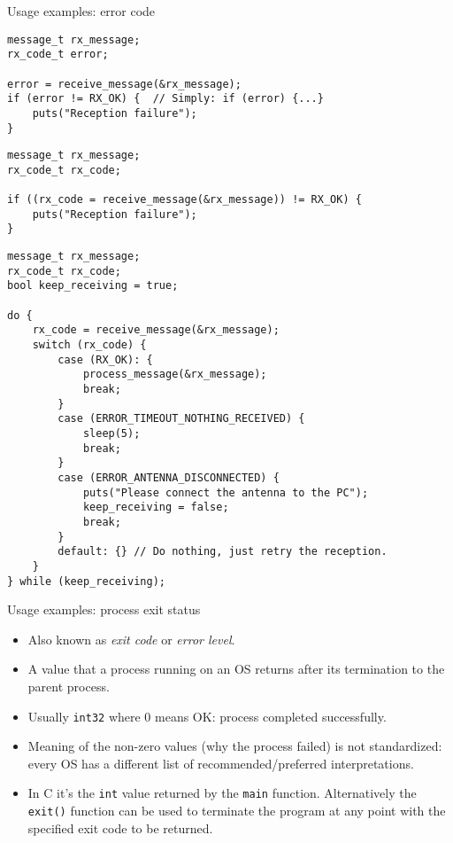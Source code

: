 \documentclass[aspectratio=169,14pt]{beamer}
\begin{document}
\begin{frame}[fragile]{Usage examples: error code}
\begin{lstlisting}[style=cstyle]
message_t rx_message;
rx_code_t error;

error = receive_message(&rx_message);
if (error != RX_OK) {  // Simply: if (error) {...}
    puts("Reception failure");
}
\end{lstlisting}

\begin{lstlisting}[style=cstyle]
message_t rx_message;
rx_code_t rx_code;

if ((rx_code = receive_message(&rx_message)) != RX_OK) {
    puts("Reception failure");
}
\end{lstlisting}
\end{frame}



\begin{frame}[fragile]{}
\begin{lstlisting}[style=cstyle,basicstyle=\scriptsize\ttfamily]
message_t rx_message;
rx_code_t rx_code;
bool keep_receiving = true;

do {
    rx_code = receive_message(&rx_message);
    switch (rx_code) {
        case (RX_OK): {
            process_message(&rx_message);
            break;
        }
        case (ERROR_TIMEOUT_NOTHING_RECEIVED) {
            sleep(5);
            break;
        }
        case (ERROR_ANTENNA_DISCONNECTED) {
            puts("Please connect the antenna to the PC");
            keep_receiving = false;
            break;
        }
        default: {} // Do nothing, just retry the reception.
    }
} while (keep_receiving);
\end{lstlisting}
\end{frame}



\begin{frame}{Usage examples: process exit status}
\begin{itemize}
    \item Also known as \textit{exit code} or \textit{error level}.
    \item A value that a process running on an OS returns after its termination to the parent process.
    \item Usually \texttt{int32} where 0 means OK: process completed successfully.
    \item Meaning of the non-zero values (why the process failed) is not standardized: every OS has a different list of recommended/preferred interpretations.
    \item In C it's the \texttt{int} value returned by the \texttt{main} function. Alternatively the \texttt{exit()} function can be used to terminate the program at any point with the specified exit code to be returned.
\end{itemize}
\end{frame}
\end{document}
